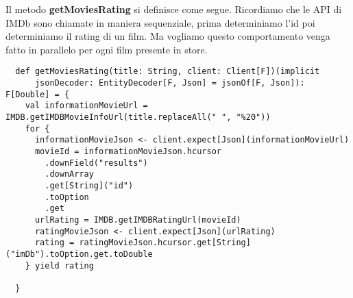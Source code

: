 \noindent Il metodo \textbf{getMoviesRating} si definisce come segue. Ricordiamo che le API di IMDb sono chiamate in maniera sequenziale, prima determiniamo l'id poi determiniamo il rating di un film. Ma vogliamo questo comportamento venga fatto in parallelo per ogni film presente in store.

\begin{verbatim}
  def getMoviesRating(title: String, client: Client[F])(implicit
      jsonDecoder: EntityDecoder[F, Json] = jsonOf[F, Json]): F[Double] = {
    val informationMovieUrl = IMDB.getIMDBMovieInfoUrl(title.replaceAll(" ", "%20"))
    for {
      informationMovieJson <- client.expect[Json](informationMovieUrl)
      movieId = informationMovieJson.hcursor
        .downField("results")
        .downArray
        .get[String]("id")
        .toOption
        .get
      urlRating = IMDB.getIMDBRatingUrl(movieId)
      ratingMovieJson <- client.expect[Json](urlRating)
      rating = ratingMovieJson.hcursor.get[String]("imDb").toOption.get.toDouble
    } yield rating

  }
    
\end{verbatim}